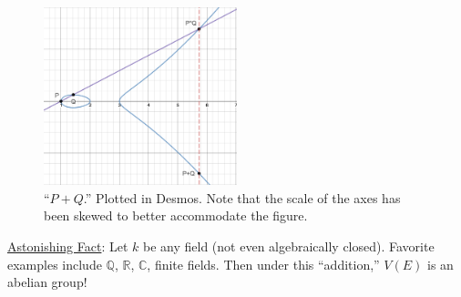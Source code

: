 \documentclass[12pt]{article}
\newcommand{\q}{\mathbb{Q}}
\newcommand{\cx}{\mathbb{C}}
\newcommand{\real}{\mathbb{R}}
\theoremstyle{definition}
\begin{document}
\begin{figure}[H]
    \centering
    \includegraphics[width=0.5\textwidth]{52.png}
    \caption{``$P+Q$.'' Plotted in Desmos. Note that the scale of the axes has been skewed to better accommodate the figure.}
\end{figure}
\underline{Astonishing Fact}: Let $k$ be any field (not even algebraically closed). Favorite examples include $\q$, $\real$, $\cx$, finite fields. Then under this ``addition,'' $V(E)$ is an abelian group!
\end{document}
